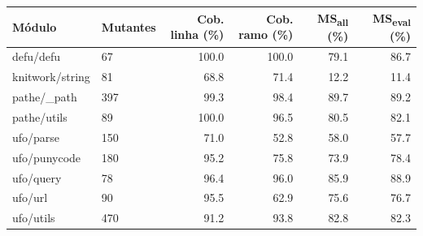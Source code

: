 \begin{tabular}{llrrrr}
\toprule
Módulo & Mutantes & Cob. linha (\%) & Cob. ramo (\%) & MS\textsubscript{all} (\%) & MS\textsubscript{eval} (\%) \\
\midrule
defu/defu & 67 & 100.0 & 100.0 & 79.1 & 86.7 \\
knitwork/string & 81 & 68.8 & 71.4 & 12.2 & 11.4 \\
pathe/\_path & 397 & 99.3 & 98.4 & 89.7 & 89.2 \\
pathe/utils & 89 & 100.0 & 96.5 & 80.5 & 82.1 \\
ufo/parse & 150 & 71.0 & 52.8 & 58.0 & 57.7 \\
ufo/punycode & 180 & 95.2 & 75.8 & 73.9 & 78.4 \\
ufo/query & 78 & 96.4 & 96.0 & 85.9 & 88.9 \\
ufo/url & 90 & 95.5 & 62.9 & 75.6 & 76.7 \\
ufo/utils & 470 & 91.2 & 93.8 & 82.8 & 82.3 \\
\bottomrule
\end{tabular}
